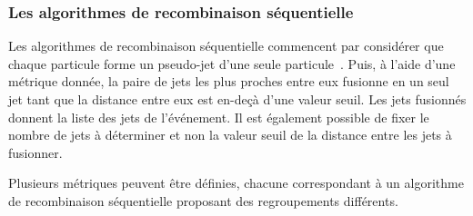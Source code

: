 \subsubsection{Les algorithmes de recombinaison séquentielle}
Les algorithmes de recombinaison séquentielle commencent par considérer que chaque particule forme un pseudo-jet d'une seule particule~\cite{Cacciari:2011ma}.
Puis, à l'aide d'une métrique donnée, la paire de jets les plus proches entre eux fusionne en un seul jet tant que la distance entre eux est en-deçà d'une valeur seuil. Les jets fusionnés donnent la liste des jets de l'événement. Il est également possible de fixer le nombre de jets à déterminer et non la valeur seuil de la distance entre les jets à fusionner.
\par Plusieurs métriques peuvent être définies, chacune correspondant à un algorithme de recombinaison séquentielle proposant des regroupements différents.
